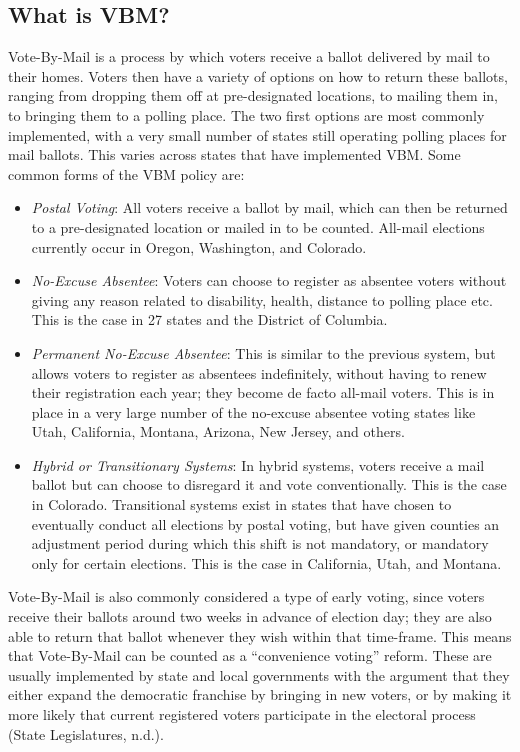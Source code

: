 \documentclass[12pt,twoside]{reedthesis}
\begin{document}
  \subsection{What is VBM?}\label{what-is-vbm}
  
  Vote-By-Mail is a process by which voters receive a ballot delivered by
  mail to their homes. Voters then have a variety of options on how to
  return these ballots, ranging from dropping them off at pre-designated
  locations, to mailing them in, to bringing them to a polling place. The
  two first options are most commonly implemented, with a very small
  number of states still operating polling places for mail ballots. This
  varies across states that have implemented VBM. Some common forms of the
  VBM policy are:
  
  \begin{itemize}
  \item
    \emph{Postal Voting}: All voters receive a ballot by mail, which can
    then be returned to a pre-designated location or mailed in to be
    counted. All-mail elections currently occur in Oregon, Washington, and
    Colorado.
  \item
    \emph{No-Excuse Absentee}: Voters can choose to register as absentee
    voters without giving any reason related to disability, health,
    distance to polling place etc. This is the case in 27 states and the
    District of Columbia.
  \item
    \emph{Permanent No-Excuse Absentee}: This is similar to the previous
    system, but allows voters to register as absentees indefinitely,
    without having to renew their registration each year; they become de
    facto all-mail voters. This is in place in a very large number of the
    no-excuse absentee voting states like Utah, California, Montana,
    Arizona, New Jersey, and others.
  \item
    \emph{Hybrid or Transitionary Systems}: In hybrid systems, voters
    receive a mail ballot but can choose to disregard it and vote
    conventionally. This is the case in Colorado. Transitional systems
    exist in states that have chosen to eventually conduct all elections
    by postal voting, but have given counties an adjustment period during
    which this shift is not mandatory, or mandatory only for certain
    elections. This is the case in California, Utah, and Montana.
  \end{itemize}
  
  Vote-By-Mail is also commonly considered a type of early voting, since
  voters receive their ballots around two weeks in advance of election
  day; they are also able to return that ballot whenever they wish within
  that time-frame. This means that Vote-By-Mail can be counted as a
  ``convenience voting'' reform. These are usually implemented by state
  and local governments with the argument that they either expand the
  democratic franchise by bringing in new voters, or by making it more
  likely that current registered voters participate in the electoral
  process (State Legislatures, n.d.).
  
\end{document}
